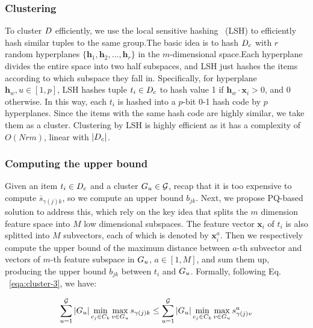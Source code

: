 \subsubsection{Clustering}
\label{subsec:clustering}
To cluster $D$ efficiently,  we use the local sensitive hashing~\cite{} (LSH) to efficiently hash similar tuples to the same group.The basic idea  is to hash $D_c$ with $r$ random hyperplanes $\{\mathbf{h}_1, \mathbf{h}_2, \dots, \mathbf{h}_r\}$ in the  $m$-dimensional space.Each hyperplane divides the entire space into two half subspaces, and LSH just hashes the  items according to which subspace they fall in. Specifically, for  hyperplane $\mathbf{h}_w, u\in[1,p]$, LSH hashes tuple $t_i\in D_c$ to hash value 1 if $\mathbf{h}_w \cdot \mathbf{x}_i> 0$, and 0 otherwise.
In this way, each $t_i$ is hashed into a $p$-bit 0-1 hash code by $p$ hyperplanes.
Since the items with the same hash code are highly similar, we take them as a cluster.
Clustering by LSH is highly efficient as it has a complexity of  $O(Nrm)$, linear with $|D_c|$. 

\subsubsection{Computing the upper bound}

Given an item $t_i\in D_c$ and a cluster $G_u \in \mathcal{G}$, recap that it is too expensive to  compute $\overline{s}_{\gamma(j)k}$, so we compute an upper bound $b_{jk}$. Next, we propose PQ-based solution to address this, which rely on the key idea that splits the $m$ dimension feature space into $M$ low dimensional subspaces. The feature vector $\mathbf{x}_i$ of  $t_i$ is also splitted into $M$ subvectors, each of which is denoted by $\mathbf{x}^a_i$. 
Then we respectively compute the upper bound of the maximum distance between $a$-th subvector and vectors of $m$-th feature subspace in $G_u$, $a\in [1,M]$, and sum them up, producing the upper bound $b_{jk}$ between $t_i$ and $G_u$. Formally, following Eq. ~\ref{eqa:cluster-3}, we have:

\begin{equation}\label{eqa:cluster-5}
    \begin{aligned}
    \sum_{u=1}^{\mathcal{G}} |G_u| \min_{c_j\in C_k} \max_{v \in G_u} s_{\gamma(j)k} \leq\sum_{u=1}^{\mathcal{G}} |G_u| \min_{c_j\in C_k} \max_{v \in G_u} s^a_{\gamma(j)v}
    \end{aligned}
\end{equation}

